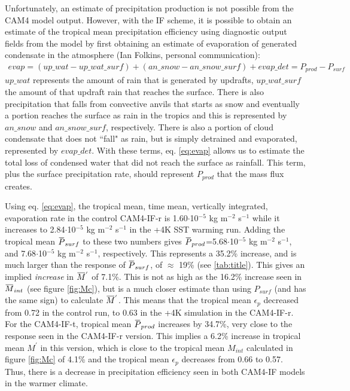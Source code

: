 \documentclass[letterpaper,12pt,titlepage,oneside,final]{book}
\newcommand{\overbar}[1]{\mkern 1.5mu\overline{\mkern-1.5mu#1\mkern-1.5mu}\mkern 1.5mu}
\begin{document}
Unfortunately, an estimate of precipitation production is not possible from the CAM4 model output. However, with the IF scheme, it is possible to obtain an estimate of the tropical mean precipitation efficiency using diagnostic output fields from the model by first obtaining an estimate of evaporation of generated condensate in the atmosphere (Ian Folkins, personal communication):
\begin{align}\label{eq:evap}
evap=(up\_wat - up\_wat\_surf)+(an\_snow - an\_snow\_surf)+evap\_det=P_{prod}-P_{surf}
\end{align}
$up\_wat$ represents the amount of rain that is generated by updrafts, $up\_wat\_surf$ the amount of that updraft rain that reaches the surface. There is also precipitation that falls from convective anvils that starts as snow and eventually a portion reaches the surface as rain in the tropics and this is represented by $an\_snow$ and $an\_snow\_surf$, respectively. There is also a portion of cloud condensate that does not ``fall" as rain, but is simply detrained and evaporated, represented by $evap\_det$. With these terms, eq. \ref{eq:evap} allows us to estimate the total loss of condensed water that did not reach the surface as rainfall. This term, plus the surface precipitation rate, should represent $P_{prod}$ that the mass flux creates. 

Using eq. \ref{eq:evap}, the tropical mean, time mean, vertically integrated, evaporation rate in the control CAM4-IF-r is 1.60$\cdot$10$^{-5}$ kg m$^{-2}$ s$^{-1}$ while it increases to 2.84$\cdot$10$^{-5}$ kg m$^{-2}$ s$^{-1}$ in the +4K SST warming run. Adding the tropical mean $\overbar{P}_{surf}$ to these two numbers gives $\overbar{P}_{prod}$=5.68$\cdot$10$^{-5}$ kg m$^{-2}$ s$^{-1}$, and 7.68$\cdot$10$^{-5}$ kg m$^{-2}$ s$^{-1}$, respectively. This represents a 35.2\% increase, and is much larger than the response of $\overbar{P}_{surf}$, of $\approx$ 19\% (see \ref{tab:title}). This gives an implied \textit{increase} in $\overbar{M}^{'}$ of 7.1\%. This is not as high as the  16.2\% increase seen in $\overbar{M}_{int}$ (see figure \ref{fig:Mc}), but is a much closer estimate than using $P_{surf}$ (and has the same sign) to calculate $\overbar{M}^{'}$. This means that the tropical mean $\epsilon_{p}$ decreased from 0.72 in the control run, to 0.63 in the +4K simulation in the CAM4-IF-r. For the CAM4-IF-t, tropical mean $\overbar{P}_{prod}$ increases by 34.7\%, very close to the response seen in the CAM4-IF-r version. This implies a 6.2\% increase in tropical mean $M^{'}$ in this version, which is close to the tropical mean $M_{int}$ calculated in figure \ref{fig:Mc} of 4.1\% and the tropical mean $\epsilon_{p}$ decreases from 0.66 to 0.57. Thus, there is a decrease in precipitation efficiency seen in both CAM4-IF models in the warmer climate.
\end{document}
